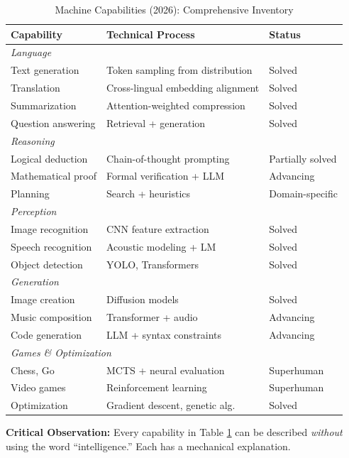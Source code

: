 \begin{table}[htbp]
\centering
\caption{Machine Capabilities (2026): Comprehensive Inventory}
\label{tab:hi-capabilities}
\renewcommand{\arraystretch}{1.3}
\begin{tabular}{@{}p{3.5cm}p{4cm}p{4.5cm}@{}}
\toprule
\textbf{Capability} & \textbf{Technical Process} & \textbf{Status} \\
\midrule
\multicolumn{3}{l}{\textit{Language}} \\
Text generation & Token sampling from distribution & Solved \\
Translation & Cross-lingual embedding alignment & Solved \\
Summarization & Attention-weighted compression & Solved \\
Question answering & Retrieval + generation & Solved \\
\midrule
\multicolumn{3}{l}{\textit{Reasoning}} \\
Logical deduction & Chain-of-thought prompting & Partially solved \\
Mathematical proof & Formal verification + LLM & Advancing \\
Planning & Search + heuristics & Domain-specific \\
\midrule
\multicolumn{3}{l}{\textit{Perception}} \\
Image recognition & CNN feature extraction & Solved \\
Speech recognition & Acoustic modeling + LM & Solved \\
Object detection & YOLO, Transformers & Solved \\
\midrule
\multicolumn{3}{l}{\textit{Generation}} \\
Image creation & Diffusion models & Solved \\
Music composition & Transformer + audio & Advancing \\
Code generation & LLM + syntax constraints & Advancing \\
\midrule
\multicolumn{3}{l}{\textit{Games \& Optimization}} \\
Chess, Go & MCTS + neural evaluation & Superhuman \\
Video games & Reinforcement learning & Superhuman \\
Optimization & Gradient descent, genetic alg. & Solved \\
\bottomrule
\end{tabular}
\end{table}

\textbf{Critical Observation:} Every capability in Table \ref{tab:hi-capabilities} can be described \textit{without} using the word ``intelligence.'' Each has a mechanical explanation.


